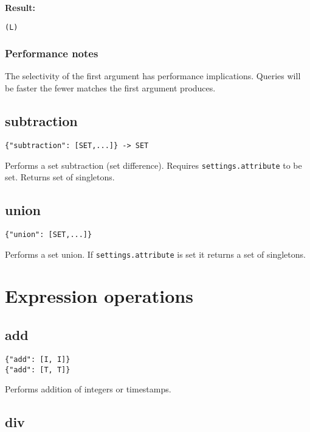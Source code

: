 \documentclass[12pt]{article}
\begin{document}
\textbf{Result: }

\begin{verbatim}
(L)
\end{verbatim}

\subsubsection{Performance notes}

The selectivity of the first argument has performance implications. Queries will be faster the fewer matches the first argument produces. 

\subsection{subtraction}

\begin{verbatim}
{"subtraction": [SET,...]} -> SET
\end{verbatim}

Performs a set subtraction (set difference). Requires \verb|settings.attribute| to be set. Returns set of singletons.

\subsection{union}

\begin{verbatim}
{"union": [SET,...]}
\end{verbatim}

Performs a set union. If \verb|settings.attribute| is set it returns a set of singletons.

\section{Expression operations}

\subsection{add}

\begin{verbatim}
{"add": [I, I]}
{"add": [T, T]}
\end{verbatim}

Performs addition of integers or timestamps.

\subsection{div}
\end{document}
